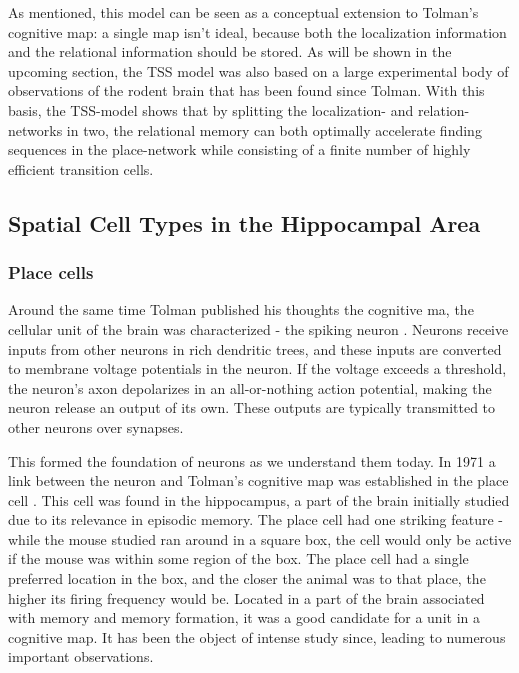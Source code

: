 \documentclass{article}
\begin{document}
    As mentioned, this model can be seen as a conceptual extension to Tolman's cognitive map: a single map isn't ideal, because both the localization information and the relational information should be stored. As will be shown in the upcoming section, the TSS model was also based on a large experimental body of observations of the rodent brain that has been found since Tolman. With this basis, the TSS-model shows that by splitting the localization- and relation-networks in two, the relational memory can both optimally accelerate finding sequences in the place-network while consisting of a finite number of highly efficient transition cells.

    \subsection{Spatial Cell Types in the Hippocampal Area} \label{Spatial Cell}
    
    \subsubsection{Place cells} \label{place cells}
    Around the same time Tolman published his thoughts the cognitive ma, the cellular unit of the brain was characterized - the spiking neuron \parencite{Hodgkin1952}. Neurons receive inputs from other neurons in rich dendritic trees, and these inputs are converted to membrane voltage potentials in the neuron. If the voltage exceeds a threshold, the neuron's axon depolarizes in an all-or-nothing action potential, making the neuron release an output of its own. These outputs are typically transmitted to other neurons over synapses.

    This formed the foundation of neurons as we understand them today. In 1971 a link between the neuron and Tolman's cognitive map was established in the place cell \parencite{OKeefe1971,OKeefe1976}. This cell was found in the hippocampus, a part of the brain initially studied due to its relevance in episodic memory. The place cell had one striking feature - while the mouse studied ran around in a square box, the cell would only be active if the mouse was within some region of the box. The place cell had a single preferred location in the box, and the closer the animal was to that place, the higher its firing frequency would be. Located in a part of the brain associated with memory and memory formation, it was a good candidate for a unit in a cognitive map. It has been the object of intense study since, leading to numerous important observations.
\end{document}
